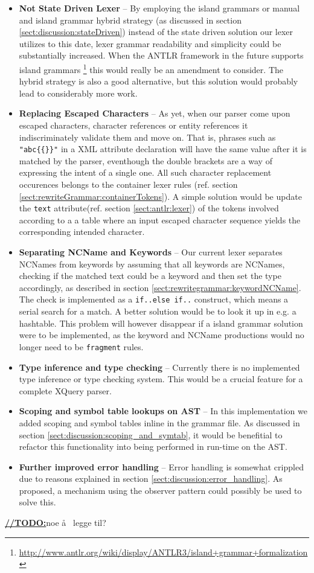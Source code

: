 \begin{itemize}
\item \textbf{Not State Driven Lexer} -- By employing the island grammars or
manual and island grammar hybrid strategy (as discussed in section
\ref{sect:discussion:stateDriven}) instead of the state driven solution our
lexer utilizes to this date, lexer grammar readability and simplicity could be
substantially increased. When the ANTLR framework in the future supports island
grammars
\footnote{\url{http://www.antlr.org/wiki/display/ANTLR3/island+grammar+formalization}}
this would really be an amendment to consider. The hybrid strategy is also a
good alternative, but this solution would probably lead to considerably more
work.

\item \textbf{Replacing Escaped Characters} -- As yet, when our parser come
upon escaped characters, character references or entity references it
indiscriminately validate them and move on. That is, phrases such as
\verb!"abc{{}}"! in a XML attribute declaration will have the same value after
it is matched by the parser, eventhough the double brackets are a way of
expressing the intent of a single one. All such character replacement
occurences belongs to the container lexer rules (ref. section
\ref{sect:rewriteGrammar:containerTokens}). A simple solution would be update
the \verb!text! attribute(ref. section \ref{sect:antlr:lexer}) of the tokens
involved according to a a table where an input escaped character sequence
yields the corresponding intended character.

\item \textbf{Separating NCName and Keywords} -- Our current lexer separates
NCNames from keywords by assuming that all keywords are NCNames, checking if
the matched text could be a keyword and then set the type accordingly, as
described in section \ref{sect:rewritegrammar:keywordNCName}. The check is
implemented as a \verb!if..else if..! construct, which means a serial search
for a match. A better solution would be to look it up in e.g. a hashtable. This
problem will however disappear if a island grammar solution were to be
implemented, as the keyword and NCName productions would no longer need to be
\verb!fragment! rules.

\item \textbf{Type inference and type checking} -- Currently there is no
implemented type inference or type checking system. This would be a crucial
feature for a complete XQuery parser.

\item \textbf{Scoping and symbol table lookups on AST} -- In this implementation
we added scoping and symbol tables inline in the grammar file. As discussed in
section \ref{sect:discussion:scoping_and_symtab}, it would be benefitial to
refactor this functionality into being performed in run-time on the AST.

\item \textbf{Further improved error handling} -- Error handling is somewhat
crippled due to reasons explained in section
\ref{sect:discussion:error_handling}. As proposed, a mechanism using the
observer pattern could possibly be used to solve this.

\end{itemize}
\underline{\textbf{\LARGE //TODO:}}noe \aa~ legge til?




